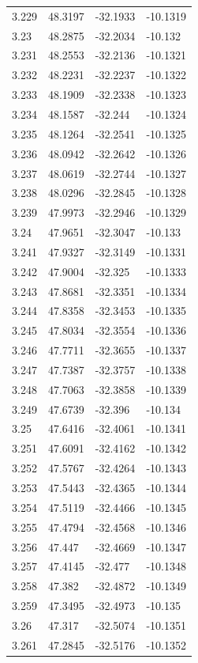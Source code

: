 \begin{tabular}{llll}
3.229 & 48.3197 & -32.1933 & -10.1319 \\
3.23 & 48.2875 & -32.2034 & -10.132 \\
3.231 & 48.2553 & -32.2136 & -10.1321 \\
3.232 & 48.2231 & -32.2237 & -10.1322 \\
3.233 & 48.1909 & -32.2338 & -10.1323 \\
3.234 & 48.1587 & -32.244 & -10.1324 \\
3.235 & 48.1264 & -32.2541 & -10.1325 \\
3.236 & 48.0942 & -32.2642 & -10.1326 \\
3.237 & 48.0619 & -32.2744 & -10.1327 \\
3.238 & 48.0296 & -32.2845 & -10.1328 \\
3.239 & 47.9973 & -32.2946 & -10.1329 \\
3.24 & 47.9651 & -32.3047 & -10.133 \\
3.241 & 47.9327 & -32.3149 & -10.1331 \\
3.242 & 47.9004 & -32.325 & -10.1333 \\
3.243 & 47.8681 & -32.3351 & -10.1334 \\
3.244 & 47.8358 & -32.3453 & -10.1335 \\
3.245 & 47.8034 & -32.3554 & -10.1336 \\
3.246 & 47.7711 & -32.3655 & -10.1337 \\
3.247 & 47.7387 & -32.3757 & -10.1338 \\
3.248 & 47.7063 & -32.3858 & -10.1339 \\
3.249 & 47.6739 & -32.396 & -10.134 \\
3.25 & 47.6416 & -32.4061 & -10.1341 \\
3.251 & 47.6091 & -32.4162 & -10.1342 \\
3.252 & 47.5767 & -32.4264 & -10.1343 \\
3.253 & 47.5443 & -32.4365 & -10.1344 \\
3.254 & 47.5119 & -32.4466 & -10.1345 \\
3.255 & 47.4794 & -32.4568 & -10.1346 \\
3.256 & 47.447 & -32.4669 & -10.1347 \\
3.257 & 47.4145 & -32.477 & -10.1348 \\
3.258 & 47.382 & -32.4872 & -10.1349 \\
3.259 & 47.3495 & -32.4973 & -10.135 \\
3.26 & 47.317 & -32.5074 & -10.1351 \\
3.261 & 47.2845 & -32.5176 & -10.1352 \\

\end{tabular}
